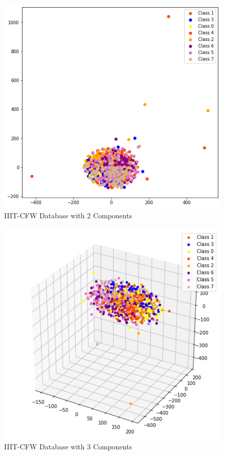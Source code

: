 \documentclass[12pt]{article}
\newenvironment{problem}[2][Problem]{\begin{trivlist}
\item[\hskip \labelsep {\bfseries #1}\hskip \labelsep {\bfseries #2.}]}{\end{trivlist}}
\begin{document}
\begin{problem}{3}
	\begin{figure}[H]
		\centering
		\includegraphics[width=16cm]{IIIT_CFW_Database_with_2_Components.png}
		\caption{IIIT-CFW Database with 2 Components}
	\end{figure}
	
	
	\begin{figure}[H]
		\centering
		\includegraphics[width=16cm]{IIIT_CFW_Database_with_3_Components.png}
		\caption{IIIT-CFW Database with 3 Components}
	\end{figure}
	


\end{problem}
\end{document}
